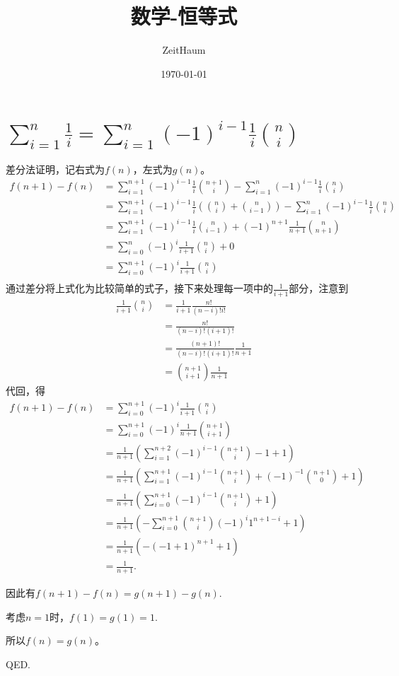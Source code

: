 \documentclass{article}
\author{ZeitHaum}
\date{\today}
\title{数学-恒等式}
\begin{document}
    \maketitle
    \newpage 
    \tableofcontents
    \newpage
    \setcounter{page}{1}
    \section{$\displaystyle{\sum_{i=1}^{n}\frac{1}{i}} = \sum_{i=1}^{n}(-1)^{i-1}\frac{1}{i}\binom{n}{i}$}
    差分法证明，记右式为$f(n)$，左式为$g(n)$。
    \begin{align*}
        f(n+1) - f(n) &= \displaystyle \sum_{i = 1}^{n+1} (-1)^{i-1} \frac{1}{i}\binom{n+1}{i} - \sum_{i=1}^{n}(-1)^{i-1}\frac{1}{i}\binom{n}{i} \\
        &= \displaystyle \sum_{i=1}^{n+1}(-1)^{i-1} \frac{1}{i}(\binom{n}{i} + \binom{n}{i-1}) - \sum_{i=1}^{n}(-1)^{i-1}\frac{1}{i}\binom{n}{i} \\
        &= \displaystyle \sum_{i=1}^{n+1}(-1)^{i-1} \frac{1}{i} \binom{n}{i-1} + (-1)^{n+1} \frac{1}{n+1} \binom{n}{n+1}\\
        &= \displaystyle \sum_{i=0}^{n}(-1)^i \frac{1}{i+1} \binom{n}{i} + 0 \\
        &= \displaystyle \sum_{i=0}^{n+1}(-1)^i \frac{1}{i+1} \binom{n}{i} \\ 
    \end{align*}
    通过差分将上式化为比较简单的式子，接下来处理每一项中的$\frac{1}{i+1}$部分，注意到
    \begin{align*}
        \frac{1}{i+1} \binom{n}{i} &= \frac{1}{i+1} \frac{n!}{(n-i)!i!} \\
        &= \frac{n!}{(n-i)!(i+1)!} \\
        &= \frac{(n+1)!}{(n-i)!(i+1)!} \frac{1}{n+1} \\
        &= \binom{n+1}{i+1} \frac{1}{n+1}
    \end{align*}
    代回，得
    \begin{align*}
        f(n+1) - f(n) &= \displaystyle \sum_{i=0}^{n+1}(-1)^i \frac{1}{i+1} \binom{n}{i} \\ 
        &= \displaystyle \sum_{i=0}^{n+1}(-1)^i \frac{1}{n+1} \binom{n+1}{i+1} \\
        &= \displaystyle \frac{1}{n+1} (\sum_{i=1}^{n+2} (-1)^{i-1} \binom{n+1}{i} -1 + 1)\\
        &= \displaystyle \frac{1}{n+1} (\sum_{i=1}^{n+1} (-1)^{i-1} \binom{n+1}{i} + (-1)^{-1}\binom{n+1}{0} +1)\\
        &= \displaystyle \frac{1}{n+1} (\sum_{i=0}^{n+1} (-1)^{i-1} \binom{n+1}{i} + 1)\\
        &= \displaystyle \frac{1}{n+1} (-\sum_{i=0}^{n+1}\binom{n+1}{i} (-1)^i 1^{n+1-i} + 1) \\
        &= \displaystyle \frac{1}{n+1} (-(-1+1)^{n+1} + 1) \\
        &= \displaystyle \frac{1}{n+1}. 
    \end{align*}
    
    因此有$f(n+1) - f(n) = g(n+1) - g(n)$.
    
    考虑$n = 1$时，$f(1) = g(1) = 1$.
    
    所以$f(n) = g(n)$。

    QED.
\end{document}
